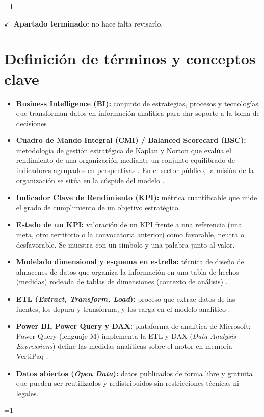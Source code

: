 \documentclass[12pt, a4paper, oneside]{report}
\newcommand{\mostrarterminados}{1}
\newenvironment{revisado}
  {\ifnum\mostrarterminados=1\relax\begin{cajarevisada}\noindent\colorbox{verdeterminado}{\parbox{\dimexpr\linewidth-2\fboxsep\relax}{\small$\checkmark$\ \textbf{Apartado terminado:} no hace falta revisarlo.}}\par\medskip\fi}
  {\ifnum\mostrarterminados=1\relax\end{cajarevisada}\fi}
\begin{document}
\begin{revisado}
\section{Definición de términos y conceptos clave}
\begin{itemize}
    \item \textbf{Business Intelligence (BI):} conjunto de estrategias, procesos y tecnologías que transforman datos en información analítica para dar soporte a la toma de decisiones \cite{sharda2014business}.
    \item \textbf{Cuadro de Mando Integral (CMI) / Balanced Scorecard (BSC):} metodología de gestión estratégica de Kaplan y Norton que evalúa el rendimiento de una organización mediante un conjunto equilibrado de indicadores agrupados en perspectivas \cite{kaplan1992balanced}. En el sector público, la misión de la organización se sitúa en la cúspide del modelo \cite{niven2008balanced}.
    \item \textbf{Indicador Clave de Rendimiento (KPI):} métrica cuantificable que mide el grado de cumplimiento de un objetivo estratégico.
    \item \textbf{Estado de un KPI:} valoración de un KPI frente a una referencia (una meta, otro territorio o la convocatoria anterior) como favorable, neutra o desfavorable. Se muestra con un símbolo y una palabra junto al valor.
    \item \textbf{Modelado dimensional y esquema en estrella:} técnica de diseño de almacenes de datos que organiza la información en una tabla de hechos (medidas) rodeada de tablas de dimensiones (contexto de análisis) \cite{kimball2013data}.
    \item \textbf{ETL (\textit{Extract, Transform, Load}):} proceso que extrae datos de las fuentes, los depura y transforma, y los carga en el modelo analítico \cite{kimball2013data}.
    \item \textbf{Power BI, Power Query y DAX:} plataforma de analítica de Microsoft; Power Query (lenguaje M) implementa la ETL y DAX (\textit{Data Analysis Expressions}) define las medidas analíticas sobre el motor en memoria VertiPaq \cite{ferrari2019definitive}.
    \item \textbf{Datos abiertos (\textit{Open Data}):} datos publicados de forma libre y gratuita que pueden ser reutilizados y redistribuidos sin restricciones técnicas ni legales.
\end{itemize}


\end{revisado}
\end{document}
